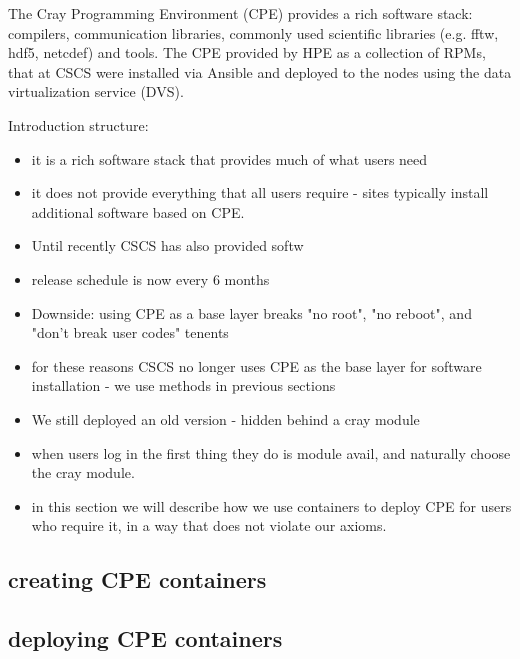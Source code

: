 The Cray Programming Environment (CPE) provides a rich software stack: compilers, communication libraries, commonly used scientific libraries (e.g. fftw, hdf5, netcdef) and tools.
The CPE provided by HPE as a collection of RPMs, that at CSCS were installed via Ansible and deployed to the nodes using the data virtualization service (DVS)\cite{dvs}.

Introduction structure:
\begin{itemize}
    \item it is a rich software stack that provides much of what users need
    \item it does not provide everything that all users require - sites typically install additional software based on CPE.
    \item Until recently CSCS has also provided softw
    \item release schedule is now every 6 months
    \item Downside: using CPE as a base layer breaks "no root", "no reboot", and "don't break user codes" tenents
    \item for these reasons CSCS no longer uses CPE as the base layer for software installation - we use methods in previous sections
    \item We still deployed an old version - hidden behind a cray module
    \item when users log in the first thing they do is module avail, and naturally choose the cray module.
    \item in this section we will describe how we use containers to deploy CPE for users who require it, in a way that does not violate our axioms.
\end{itemize}


\subsection{creating CPE containers}

\subsection{deploying CPE containers}


